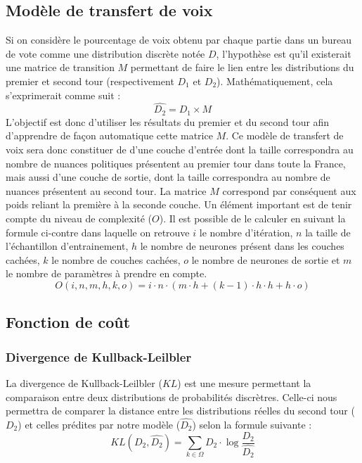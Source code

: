 \documentclass[11pt]{article}
\begin{document}
        \subsection*{Modèle de transfert de voix}
            Si on considère le pourcentage de voix obtenu par chaque partie dans un bureau de vote comme une distribution discrète notée $D$, l'hypothèse est qu'il existerait une matrice de transition $M$ permettant de faire le lien entre les distributions du premier et second tour (respectivement $D_1$ et $D_2$). Mathématiquement, cela s'exprimerait comme suit :
            \begin{equation}
                \hat{D_2} = D_1 \times M
            \end{equation}
            L'objectif est donc d'utiliser les résultats du premier et du second tour afin d'apprendre de façon automatique cette matrice $M$. Ce modèle de transfert de voix sera donc constituer de d'une couche d'entrée dont la taille correspondra au nombre de nuances politiques présentent au premier tour dans toute la France, mais aussi d'une couche de sortie, dont la taille correspondra au nombre de nuances présentent au second tour. La matrice $M$ correspond par conséquent aux poids reliant la première à la seconde couche. Un élément important est de tenir compte du niveau de complexité ($O$). Il est possible de le calculer en suivant la formule ci-contre dans laquelle on retrouve $i$ le nombre d'itération, $n$ la taille de l'échantillon d'entrainement, $h$ le nombre de neurones présent dans les couches cachées, $k$ le nombre de couches cachées, $o$ le nombre de neurones de sortie et $m$ le nombre de paramètres à prendre en compte.
            \begin{equation}
                O(i,n,m,h,k,o) = i \cdot n \cdot (m \cdot h + (k - 1) \cdot h \cdot h + h \cdot o)
            \end{equation}

        \subsection*{Fonction de coût}
            \subsubsection*{Divergence de Kullback-Leilbler}
                La divergence de Kullback-Leilbler \cite{Kullback_Leibler_1951} ($KL$) est une mesure permettant la comparaison entre deux distributions de probabilités discrètres. Celle-ci nous permettra de comparer la distance entre les distributions réelles du second tour ($D_2$) et celles prédites par notre modèle ($\hat{D_2}$) selon la formule suivante :
                \begin{equation}
                    KL(D_2,\hat{D_2}) = \sum_{k \in \Omega} D_2 \cdot \log \frac{D_2}{\hat{D_2}}
                \end{equation}
\end{document}

